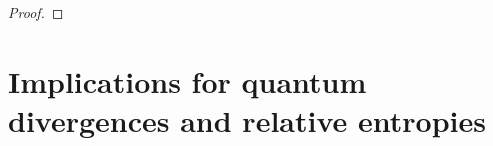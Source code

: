 \documentclass[12pt,a4paper,reqno]{amsart}
\theoremstyle{definition}
\newcommand{\mf}[1]{\mathfrak{#1}}
\newcommand{\R}{\mathbb R}
\newcommand{\T}{\mathbb T}
\let\originalleft\left
\let\originalright\right
\renewcommand{\left}{\mathopen{}\mathclose\bgroup\originalleft}
\renewcommand{\right}{\aftergroup\egroup\originalright}
\begin{document}
\begin{proof}

\end{proof}

\section{Implications for quantum divergences and relative entropies}\label{sec:quantum}
\end{document}
